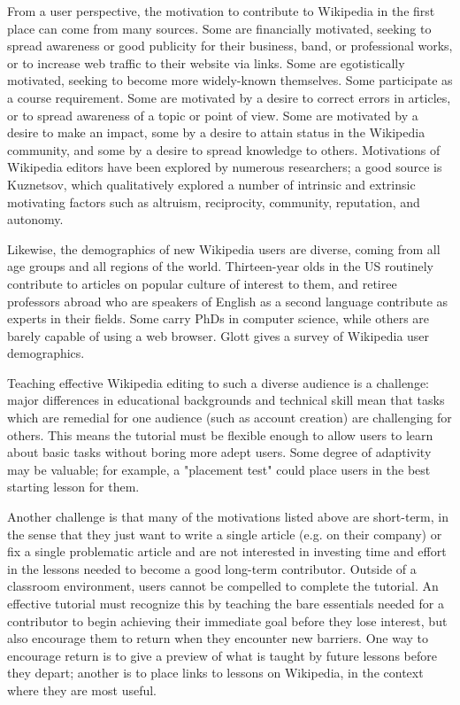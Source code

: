 \documentclass{acm_proc_article-sp}
\begin{document}
From a user perspective, the motivation to contribute to Wikipedia in the first place can come from many sources. Some are financially motivated, seeking to spread awareness or good publicity for their business, band, or professional works, or to increase web traffic to their website via links. Some are egotistically motivated, seeking to become more widely-known themselves. Some participate as a course requirement. Some are motivated by a desire to correct errors in articles, or to spread awareness of a topic or point of view. Some are motivated by a desire to make an impact, some by a desire to attain status in the Wikipedia community, and some by a desire to spread knowledge to others. Motivations of Wikipedia editors have been explored by numerous researchers; a good source is Kuznetsov,\cite{Kuznetsov:2006} which qualitatively explored a number of intrinsic and extrinsic motivating factors such as altruism, reciprocity, community, reputation, and autonomy.

Likewise, the demographics of new Wikipedia users are diverse, coming from all age groups and all regions of the world. Thirteen-year olds in the US routinely contribute to articles on popular culture of interest to them, and retiree professors abroad who are speakers of English as a second language contribute as experts in their fields. Some carry PhDs in computer science, while others are barely capable of using a web browser. Glott\cite{Glott:2010} gives a survey of Wikipedia user demographics.

Teaching effective Wikipedia editing to such a diverse audience is a challenge: major differences in educational backgrounds and technical skill mean that tasks which are remedial for one audience (such as account creation) are challenging for others. This means the tutorial must be flexible enough to allow users to learn about basic tasks without boring more adept users. Some degree of adaptivity may be valuable; for example, a "placement test" could place users in the best starting lesson for them.

Another challenge is that many of the motivations listed above are short-term, in the sense that they just want to write a single article (e.g. on their company) or fix a single problematic article and are not interested in investing time and effort in the lessons needed to become a good long-term contributor. Outside of a classroom environment, users cannot be compelled to complete the tutorial. An effective tutorial must recognize this by teaching the bare essentials needed for a contributor to begin achieving their immediate goal before they lose interest, but also encourage them to return when they encounter new barriers. One way to encourage return is to give a preview of what is taught by future lessons before they depart; another is to place links to lessons on Wikipedia, in the context where they are most useful.
\end{document}

